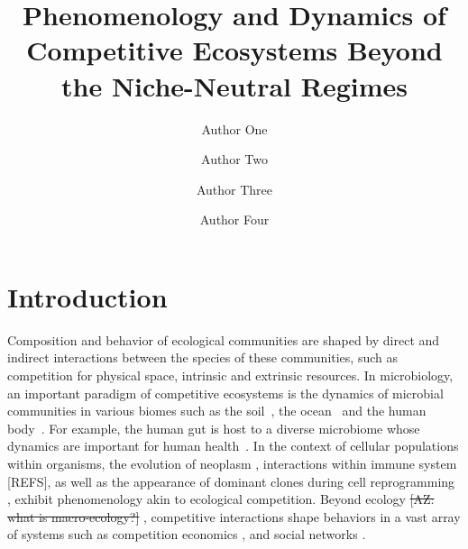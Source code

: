\documentclass[9pt,twocolumn,twoside,lineno]{pnas-new}
\title{Phenomenology  and Dynamics of Competitive Ecosystems Beyond the Niche-Neutral Regimes }
\author[a,c,1]{Author One}
\author[b,1,2]{Author Two}
\author[a]{Author Three}
\author[a]{Author Four}
\affil[a]{Affiliation One}
\affil[b]{Affiliation Two}
\affil[c]{Affiliation Three}
\begin{document}
\maketitle
\thispagestyle{firststyle}


\maketitle

\section{Introduction}
\label{sec:introduction}

Composition and behavior of ecological communities are shaped by direct and indirect interactions between the species of these communities, such as competition for physical space, intrinsic and extrinsic resources. %
In microbiology, an important paradigm of competitive ecosystems is the dynamics of microbial communities in various biomes such as the soil~\cite{ratzke2020strength}, the ocean~\cite{tilman1977resource,strom2008microbial} and the human body~\cite{foster2017evolution}. 
For example, the human gut is host to a diverse microbiome whose dynamics are important for human health~\cite{coyte2015ecology,gorter2020understanding}. 
In the context of cellular populations within organisms,  the evolution of neoplasm \cite{merlo2006cancer,kareva2015cancer}, interactions within immune system [REFS], as well as the appearance of dominant clones during cell reprogramming \cite{shakiba2019cell}, exhibit phenomenology akin to ecological competition. 
Beyond ecology \st{[AZ: what is macro-ecology?]} \cite{tilman1982resource,morin2009community,tuljapurkar2013population}, competitive interactions shape behaviors in a vast array of systems such as competition economics \cite{budzinski2007monoculture}, and social networks \cite{koura2017competitive}.
\end{document}

